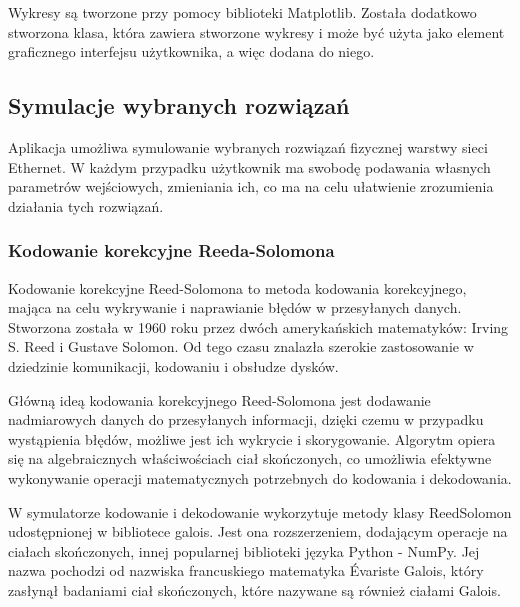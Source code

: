 Wykresy są tworzone przy pomocy biblioteki Matplotlib. Została dodatkowo stworzona klasa, która zawiera stworzone wykresy i może być użyta jako element graficznego interfejsu użytkownika, a więc dodana do niego.

\subsection{Symulacje wybranych rozwiązań}
Aplikacja umożliwa symulowanie wybranych rozwiązań fizycznej warstwy sieci Ethernet. W każdym przypadku użytkownik ma swobodę podawania własnych parametrów wejściowych, zmieniania ich, co ma na celu ułatwienie zrozumienia działania tych rozwiązań.

\subsubsection{Kodowanie korekcyjne Reeda-Solomona}
Kodowanie korekcyjne Reed-Solomona to metoda kodowania korekcyjnego, mająca na celu wykrywanie i naprawianie błędów w przesyłanych danych. Stworzona została w 1960 roku przez dwóch amerykańskich matematyków: Irving S. Reed i Gustave Solomon. Od tego czasu znalazła szerokie zastosowanie w dziedzinie komunikacji, kodowaniu i obsłudze dysków.

Główną ideą kodowania korekcyjnego Reed-Solomona jest dodawanie nadmiarowych danych do przesyłanych informacji, dzięki czemu w przypadku wystąpienia błędów, możliwe jest ich wykrycie i skorygowanie. Algorytm opiera się na algebraicznych właściwościach ciał skończonych, co umożliwia efektywne wykonywanie operacji matematycznych potrzebnych do kodowania i dekodowania.

W symulatorze kodowanie i dekodowanie wykorzytuje metody klasy ReedSolomon udostępnionej w bibliotece galois. Jest ona rozszerzeniem, dodającym operacje na ciałach skończonych, innej popularnej biblioteki języka Python - NumPy. Jej nazwa pochodzi od nazwiska francuskiego matematyka Évariste Galois, który zasłynął badaniami ciał skończonych, które nazywane są również ciałami Galois.

